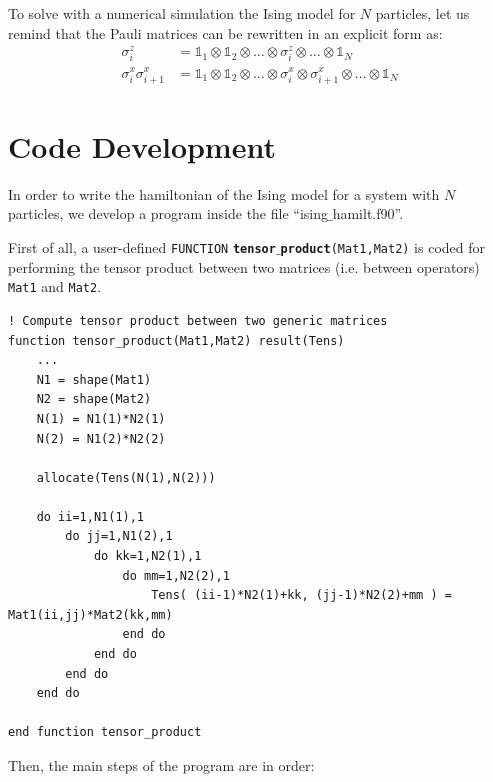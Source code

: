 \documentclass[rmp,10pt,onecolumn,fleqn,notitlepage]{revtex4-1}
\begin{document}
To solve with a numerical simulation the Ising model for \( N \) particles, let us remind that the Pauli matrices can be rewritten in an explicit form as:
\begin{subequations}
\begin{align}
 \sigma _i^z  &= \mathbb{1}_1 \otimes \mathbb{1}_2 \otimes \dots \otimes \sigma _i^z \otimes \dots \otimes \mathbb{1}_N \label{eq:rel_sigma_z}\\
 \sigma _{i}^{x} \sigma _{i+1}^{x} &= \mathbb{1}_1 \otimes \mathbb{1}_2 \otimes \dots \otimes \sigma _i^x \otimes \sigma _{i+1}^x \otimes \dots \otimes \mathbb{1}_N\label{eq:rel_sigma_x}
\end{align}
\end{subequations}


\section{Code Development}

In order to write the hamiltonian of the Ising model for a system with $N$ particles, we develop a program inside the file “ising$\_$hamilt.f90”.

First of all, a user-defined \texttt{FUNCTION} {\bfseries\texttt{tensor$\_$product}}\texttt{(Mat1,Mat2)} is coded for performing the tensor product between two matrices (i.e. between operators) \texttt{Mat1} and \texttt{Mat2}.

\begin{minipage}[t]{0.9\linewidth}%
\begin{lstlisting}[style=Fortran]
! Compute tensor product between two generic matrices
function tensor_product(Mat1,Mat2) result(Tens)
    ...
    N1 = shape(Mat1)
    N2 = shape(Mat2)
    N(1) = N1(1)*N2(1)
    N(2) = N1(2)*N2(2)

    allocate(Tens(N(1),N(2)))

    do ii=1,N1(1),1
        do jj=1,N1(2),1
            do kk=1,N2(1),1
                do mm=1,N2(2),1
                    Tens( (ii-1)*N2(1)+kk, (jj-1)*N2(2)+mm ) = Mat1(ii,jj)*Mat2(kk,mm)
                end do
            end do
        end do
    end do

end function tensor_product\end{lstlisting}
\end{minipage}


Then, the main steps of the program are in order:
\end{document}

